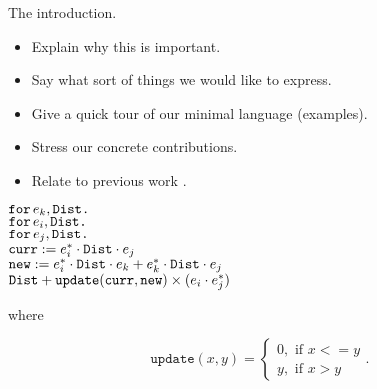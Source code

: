 The introduction.

\begin{itemize}
\item Explain why this is important.
\item Say what sort of things we would like to express.
\item Give a quick tour of our minimal language (examples).
\item Stress our concrete contributions.
\item Relate to previous work \cite{matlang,BrijderGBW19,Geerts19,HutchisonHS17}.
\end{itemize}


\noindent
$\texttt{for}\, e_k,\texttt{Dist} \texttt{.}\, $
\\
\hspace*{0.5cm} $\texttt{for}\, e_i,\texttt{Dist} \texttt{.}\, $
\\
\hspace*{1cm} $\texttt{for}\, e_j,\texttt{Dist} \texttt{.}\, $
\\
\hspace*{1.5cm} 
$\texttt{curr} := e_i^*\cdot \texttt{Dist} \cdot e_j$\\
\hspace*{1.5cm} 
$\texttt{new} := e_i^*\cdot \texttt{Dist} \cdot e_k + e_k^*\cdot \texttt{Dist}\cdot e_j$\\
\hspace*{1.5cm}
$\texttt{Dist} + \texttt{update}(\texttt{curr},\texttt{new})\times (e_i\cdot e_j^*)$

where

\[
  			\texttt{update}(x,y)=\begin{cases}
               0, \text{ if } x<=y \\
               y, \text{ if } x > y
            \end{cases}.
		\]
